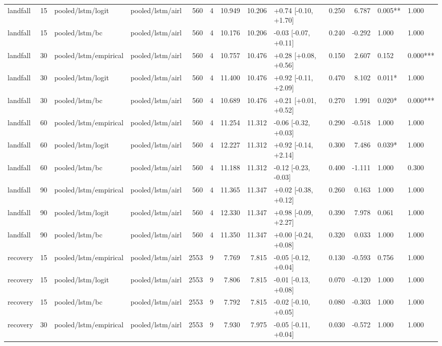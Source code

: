 \begin{tabular}{lrllrrrrlrrll}
landfall & 15 & pooled/lstm/logit & pooled/lstm/airl & 560 & 4 & 10.949 & 10.206 & +0.74 [-0.10, +1.70] & 0.250 & 6.787 & 0.005** & 1.000 \\
landfall & 15 & pooled/lstm/bc & pooled/lstm/airl & 560 & 4 & 10.176 & 10.206 & -0.03 [-0.07, +0.11] & 0.240 & -0.292 & 1.000 & 1.000 \\
landfall & 30 & pooled/lstm/empirical & pooled/lstm/airl & 560 & 4 & 10.757 & 10.476 & +0.28 [+0.08, +0.56] & 0.150 & 2.607 & 0.152 & 0.000*** \\
landfall & 30 & pooled/lstm/logit & pooled/lstm/airl & 560 & 4 & 11.400 & 10.476 & +0.92 [-0.11, +2.09] & 0.470 & 8.102 & 0.011* & 1.000 \\
landfall & 30 & pooled/lstm/bc & pooled/lstm/airl & 560 & 4 & 10.689 & 10.476 & +0.21 [+0.01, +0.52] & 0.270 & 1.991 & 0.020* & 0.000*** \\
landfall & 60 & pooled/lstm/empirical & pooled/lstm/airl & 560 & 4 & 11.254 & 11.312 & -0.06 [-0.32, +0.03] & 0.290 & -0.518 & 1.000 & 1.000 \\
landfall & 60 & pooled/lstm/logit & pooled/lstm/airl & 560 & 4 & 12.227 & 11.312 & +0.92 [-0.14, +2.14] & 0.300 & 7.486 & 0.039* & 1.000 \\
landfall & 60 & pooled/lstm/bc & pooled/lstm/airl & 560 & 4 & 11.188 & 11.312 & -0.12 [-0.23, -0.03] & 0.400 & -1.111 & 1.000 & 0.300 \\
landfall & 90 & pooled/lstm/empirical & pooled/lstm/airl & 560 & 4 & 11.365 & 11.347 & +0.02 [-0.38, +0.12] & 0.260 & 0.163 & 1.000 & 1.000 \\
landfall & 90 & pooled/lstm/logit & pooled/lstm/airl & 560 & 4 & 12.330 & 11.347 & +0.98 [-0.09, +2.27] & 0.390 & 7.978 & 0.061 & 1.000 \\
landfall & 90 & pooled/lstm/bc & pooled/lstm/airl & 560 & 4 & 11.350 & 11.347 & +0.00 [-0.24, +0.08] & 0.320 & 0.033 & 1.000 & 1.000 \\
recovery & 15 & pooled/lstm/empirical & pooled/lstm/airl & 2553 & 9 & 7.769 & 7.815 & -0.05 [-0.12, +0.04] & 0.130 & -0.593 & 0.756 & 1.000 \\
recovery & 15 & pooled/lstm/logit & pooled/lstm/airl & 2553 & 9 & 7.806 & 7.815 & -0.01 [-0.13, +0.08] & 0.070 & -0.120 & 1.000 & 1.000 \\
recovery & 15 & pooled/lstm/bc & pooled/lstm/airl & 2553 & 9 & 7.792 & 7.815 & -0.02 [-0.10, +0.05] & 0.080 & -0.303 & 1.000 & 1.000 \\
recovery & 30 & pooled/lstm/empirical & pooled/lstm/airl & 2553 & 9 & 7.930 & 7.975 & -0.05 [-0.11, +0.04] & 0.030 & -0.572 & 1.000 & 1.000 \\

\end{tabular}
